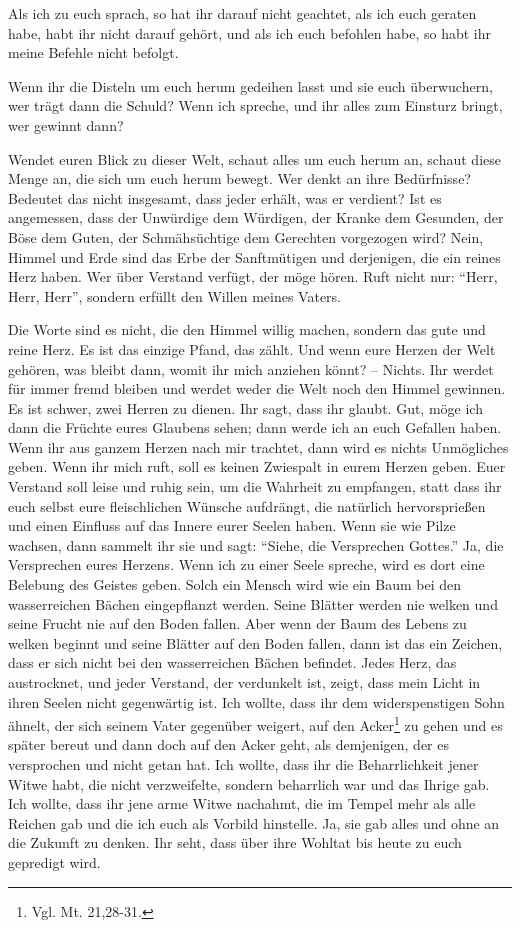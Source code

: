 Als ich zu euch sprach, so hat ihr darauf nicht geachtet, als ich euch geraten habe, habt ihr nicht darauf gehört, und als ich euch befohlen habe, so habt ihr meine Befehle nicht befolgt. 

Wenn ihr die Disteln um euch herum gedeihen lasst und sie euch überwuchern, wer trägt dann die Schuld? Wenn ich spreche, und ihr alles zum Einsturz bringt, wer gewinnt dann?

Wendet euren Blick zu dieser Welt, schaut alles um euch herum an, schaut diese Menge an, die sich um euch herum bewegt. Wer denkt an ihre Bedürfnisse? Bedeutet das nicht insgesamt, dass jeder erhält, was er verdient? Ist es angemessen, dass der Unwürdige dem Würdigen, der Kranke dem Gesunden, der Böse dem Guten, der Schmähsüchtige dem Gerechten vorgezogen wird? Nein, Himmel und Erde sind das Erbe der Sanftmütigen und derjenigen, die ein reines Herz haben. Wer über Verstand verfügt, der möge hören. Ruft nicht nur: "`Herr, Herr, Herr"', sondern erfüllt den Willen meines Vaters.

Die Worte sind es nicht, die den Himmel willig machen, sondern das gute und reine Herz. Es ist das einzige Pfand, das zählt. Und wenn eure Herzen der Welt gehören, was bleibt dann, womit ihr mich anziehen könnt? -- Nichts. Ihr werdet für immer fremd bleiben und werdet weder die Welt noch den Himmel gewinnen. Es ist schwer, zwei Herren zu dienen. Ihr sagt, dass ihr glaubt. Gut, möge ich dann die Früchte eures Glaubens sehen; dann werde ich an euch Gefallen haben. Wenn ihr aus ganzem Herzen nach mir trachtet, dann wird es nichts Unmögliches geben. Wenn ihr mich ruft, soll es keinen Zwiespalt in eurem Herzen geben. Euer Verstand soll leise und ruhig sein, um die Wahrheit zu empfangen, statt dass ihr euch selbst eure fleischlichen Wünsche aufdrängt, die natürlich hervorsprießen und einen Einfluss auf das Innere eurer Seelen haben. Wenn sie wie Pilze wachsen, dann sammelt ihr sie und sagt: "`Siehe, die Versprechen Gottes."' Ja, die Versprechen eures Herzens. Wenn ich zu einer Seele spreche, wird es dort eine Belebung des Geistes geben. Solch ein Mensch wird wie ein Baum bei den wasserreichen Bächen eingepflanzt werden. Seine Blätter werden nie welken und seine Frucht nie auf den Boden fallen. Aber wenn der Baum des Lebens zu welken beginnt und seine Blätter auf den Boden fallen, dann ist das ein Zeichen, dass er sich nicht bei den wasserreichen Bächen befindet. Jedes Herz, das austrocknet, und jeder Verstand, der verdunkelt ist, zeigt, dass mein Licht in ihren Seelen nicht gegenwärtig ist. Ich wollte, dass ihr dem widerspenstigen Sohn ähnelt, der sich seinem Vater gegenüber weigert, auf den Acker\footnote{Vgl. Mt. 21,28-31.} zu gehen und es später bereut und dann doch auf den Acker geht, als demjenigen, der es versprochen und nicht getan hat. Ich wollte, dass ihr die Beharrlichkeit jener Witwe habt, die nicht verzweifelte, sondern beharrlich war und das Ihrige gab. Ich wollte, dass ihr jene arme Witwe nachahmt, die im Tempel mehr als alle Reichen gab und die ich euch als Vorbild hinstelle. Ja, sie gab alles und ohne an die Zukunft zu denken. Ihr seht, dass über ihre Wohltat bis heute zu euch gepredigt wird. 

